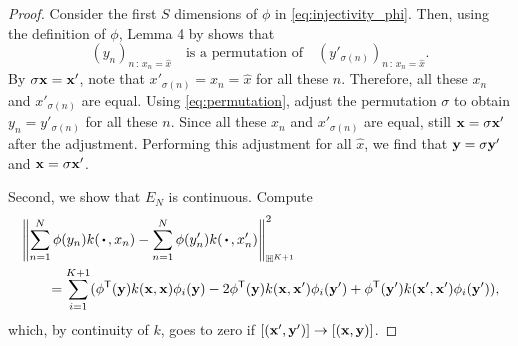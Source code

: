 \documentclass[12pt, twoside]{report}
\begin{document}
\begin{proof}
    Consider the first $S$ dimensions of $\phi$ in \eqref{eq:injectivity_phi}.
    Then, using the definition of $\phi$, Lemma 4 by \textcite{Zaheer:2017:Deep_Sets} shows that
    \begin{equation} \label{eq:permutation}
        (y_n)_{n\,:\,x_n = \hat x}
        \quad\text{is a permutation of}\quad
        (y'_{\sigma(n)})_{n\,:\,x_n = \hat x}.
    \end{equation}
    By $\sigma \mathbf{x} = \mathbf{x}'$, note that $x'_{\sigma(n)} = x_n = \hat x$ for all these $n$.
    Therefore, all these $x_n$ and $x'_{\sigma(n)}$ are equal.
    Using \eqref{eq:permutation},
    adjust the permutation $\sigma$ to obtain $y_n = y'_{\sigma(n)}$ for all these $n$.
    Since all these $x_n$ and $x'_{\sigma(n)}$ are equal,
    still $\mathbf{x} = \sigma \mathbf{x}'$ after the adjustment.
    Performing this adjustment for all $\hat x$, we find that $\mathbf{y} = \sigma \mathbf{y}'$ and $\mathbf{x} = \sigma \mathbf{x}'$.
    
    Second, we show that $E_N$ is continuous.
    Compute 
    \begin{align}
        &\left\|
            \sum_{n=1}^N \phi(y_n) k(\vardot, x_n)
            - \sum_{n=1}^{N} \phi(y'_n) k(\vardot, x'_n)
        \right\|^2_{\Hb^{K+1}}
        \\ & \qquad =
            \sum_{i=1}^{K+1} \parens{
                \phi^\T(\vy) k(\vx, \vx) \phi_i(\vy)
                - 2 \phi^\T(\vy) k(\vx, \vx') \phi_i(\vy')
                + \phi^\T(\vy') k(\vx', \vx') \phi_i(\vy')
            }, \nonumber
    \end{align}
    which, by continuity of $k$, goes to zero if $[(\mathbf{x}', \mathbf{y}')] \to [(\mathbf{x}, \mathbf{y})]$.
\end{proof}

\end{document}
